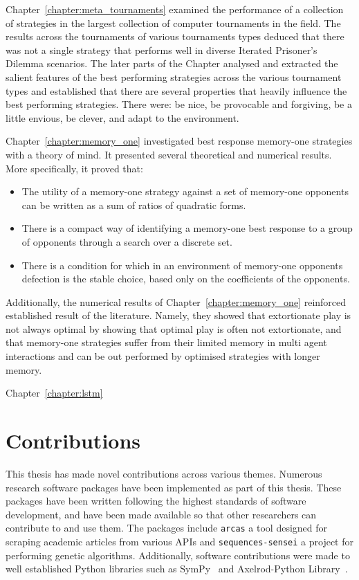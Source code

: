 Chapter~\ref{chapter:meta_tournaments} examined the performance of a collection
of \numberofstrategies strategies in the largest collection of computer
tournaments in the field. The results across the \numberofalltournaments
tournaments of various tournaments types deduced that there was not a single strategy that
performs well in diverse Iterated Prisoner's Dilemma scenarios.
The later parts of the Chapter analysed and extracted the salient features of the best
performing strategies across the various tournament types and established that there
are several properties that heavily influence the best performing
strategies. There were: be nice, be provocable and forgiving, be
a little envious, be clever, and adapt to the environment.

Chapter~\ref{chapter:memory_one} investigated best response memory-one
strategies with a theory of mind. It presented
several theoretical and numerical results. More specifically, it proved that:

\begin{itemize}
    \item The utility of a
    memory-one strategy against a set of memory-one opponents can be written as a
    sum of ratios of quadratic forms.
    \item There is a compact way of identifying
    a memory-one best response to a group of opponents through a search over a
    discrete set.
    \item There is a condition for which in an environment of
    memory-one opponents defection is the stable choice, based only on the
    coefficients of the opponents.
\end{itemize}

Additionally, the numerical results of Chapter~\ref{chapter:memory_one}
reinforced established result of the literature. Namely, they showed that
extortionate play is not always optimal by showing that optimal play is often
not extortionate, and that memory-one strategies suffer from their limited
memory in multi agent interactions and can be out performed by optimised
strategies with longer memory.

Chapter~\ref{chapter:lstm} %

\section{Contributions}

This thesis has made novel contributions across various themes. Numerous
research software packages have been implemented as part of this thesis. These
packages have been written following the highest standards of software
development, and have been made available so that other researchers can
contribute to and use them. The packages include \texttt{arcas} a tool designed for
scraping academic articles from various APIs and
\texttt{sequences-sensei} a project for performing genetic
algorithms. Additionally, software contributions were made to well established
Python libraries such as SymPy~\cite{sympy} and Axelrod-Python
Library~\cite{axelrodproject}.

